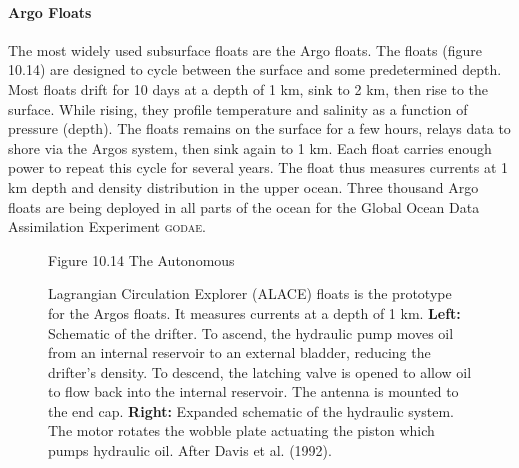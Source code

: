 \paragraph{Argo Floats}
The most widely used subsurface floats are the Argo
floats. The floats (figure 10.14) are designed to
cycle between the surface and some predetermined depth. Most floats
drift for 10 days at a depth of 1 km, sink to 2 km, then rise to the
surface. While rising, they profile temperature and salinity as a
function of pressure (depth). The floats remains on the surface for a
few hours, relays data to shore via the Argos system, then sink again to 1 km. Each float carries enough power to
repeat this cycle for several years. The float thus measures currents
at 1 km depth and density distribution in the upper ocean. Three
thousand Argo floats are being deployed in all parts of the ocean for
the Global Ocean Data Assimilation Experiment
\textsc{godae}.

\begin{figure}[h!]
\vspace{-2ex}
\footnotesize
Figure 10.14 The Autonomous \rule{0mm}{4ex}Lagrangian Circulation
Explorer (ALACE) floats is the prototype for the
Argos floats. It measures currents at a depth of 1 km. \textbf{Left:}
Schematic of the drifter. To ascend, the hydraulic pump moves oil from
an internal reservoir to an external bladder, reducing the drifter's
density. To descend, the latching valve is opened to allow oil to flow
back into the internal reservoir.  The antenna is mounted to the end
cap. \textbf{Right:} Expanded schematic of the hydraulic system. The
motor rotates the wobble plate actuating the piston which pumps
hydraulic oil. After Davis et al. (1992).
\label{fig:alace}
\vspace{-2ex}
\end{figure}

